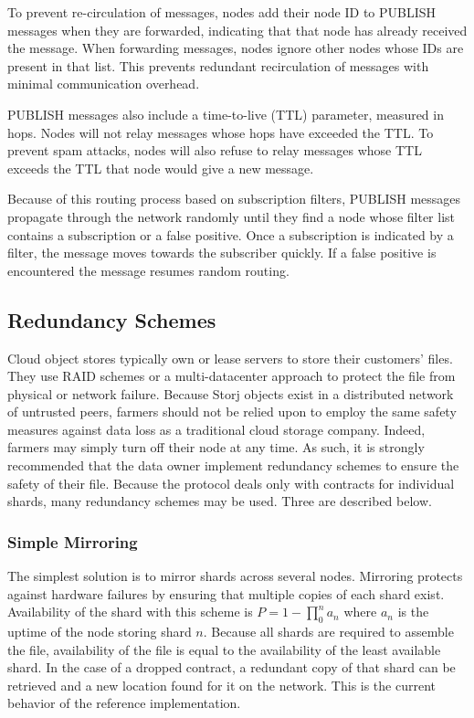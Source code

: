\documentclass[a4paper,10pt]{article}
\begin{document}
To prevent re-circulation of messages, nodes add their node ID to PUBLISH
messages when they are forwarded, indicating that that node has already received
the message. When forwarding messages, nodes ignore other nodes whose IDs are
present in that list. This prevents redundant recirculation of messages with
minimal communication overhead.

PUBLISH messages also include a time-to-live (TTL) parameter, measured in hops.
Nodes will not relay messages whose hops have exceeded the TTL. To prevent spam
attacks, nodes will also refuse to relay messages whose TTL exceeds the TTL that
node would give a new message.

Because of this routing process based on subscription filters, PUBLISH messages
propagate through the network randomly until they find a node whose filter list
contains a subscription or a false positive. Once a subscription is indicated by
a filter, the message moves towards the subscriber quickly. If a false positive
is encountered the message resumes random routing.

\subsection{Redundancy Schemes}
Cloud object stores typically own or lease servers to store their customers’
files. They use RAID schemes or a multi-datacenter approach to protect the file
from physical or network failure. Because Storj objects exist in a distributed
network of untrusted peers, farmers should not be relied upon to employ the same
safety measures against data loss as a traditional cloud storage company.
Indeed, farmers may simply turn off their node at any time. As such, it is
strongly recommended that the data owner implement redundancy schemes to ensure
the safety of their file. Because the protocol deals only with contracts for
individual shards, many redundancy schemes may be used. Three are described
below.

\subsubsection{Simple Mirroring}
The simplest solution is to mirror shards across several nodes. Mirroring
protects against hardware failures by ensuring that multiple copies of each
shard exist. Availability of the shard with this scheme is $ P = 1 -
\prod_{0}^{n} a_{n} $ where $ a_{n} $ is the uptime of the node storing shard $
n $. Because all shards are required to assemble the file, availability of the
file is equal to the availability of the least available shard. In the case of a
dropped contract, a redundant copy of that shard can be retrieved and a new
location found for it on the network. This is the current behavior of the
reference implementation.
\end{document}
